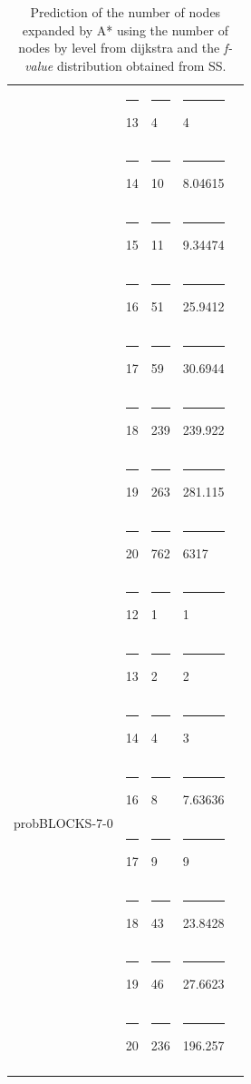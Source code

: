 \documentclass[11pt,a4paper,oneside]{report}
\begin{document}
\begin{longtable}{@{\extracolsep{\fill}} lllll @{}}
                                &\rule{4pt}{0ex} 13        &\rule{4pt}{0ex} 4               &\rule{4pt}{0ex} 4          \\ \cline{2-4} 
                                &\rule{4pt}{0ex} 14        &\rule{4pt}{0ex} 10              &\rule{4pt}{0ex} 8.04615      \\ \cline{2-4} 
                                &\rule{4pt}{0ex} 15        &\rule{4pt}{0ex} 11              &\rule{4pt}{0ex} 9.34474      \\ \cline{2-4} 
                                &\rule{4pt}{0ex} 16        &\rule{4pt}{0ex} 51              &\rule{4pt}{0ex} 25.9412      \\ \cline{2-4} 
                                &\rule{4pt}{0ex} 17        &\rule{4pt}{0ex} 59              &\rule{4pt}{0ex} 30.6944      \\ \cline{2-4} 
                                &\rule{4pt}{0ex} 18        &\rule{4pt}{0ex} 239             &\rule{4pt}{0ex} 239.922      \\ \cline{2-4} 
                                &\rule{4pt}{0ex} 19        &\rule{4pt}{0ex} 263             &\rule{4pt}{0ex} 281.115      \\ \cline{2-4} 
                                &\rule{4pt}{0ex} 20        &\rule{4pt}{0ex} 762             &\rule{4pt}{0ex} 6317         \\ \hline                                
\multirow{8}{*}{probBLOCKS-7-0} &\rule{4pt}{0ex} 12        &\rule{4pt}{0ex} 1                &\rule{4pt}{0ex} 1           \\ \cline{2-4}
                                &\rule{4pt}{0ex} 13        &\rule{4pt}{0ex} 2                &\rule{4pt}{0ex} 2           \\ \cline{2-4}
                                &\rule{4pt}{0ex} 14        &\rule{4pt}{0ex} 4                &\rule{4pt}{0ex} 3     \\ \cline{2-4}
                                &\rule{4pt}{0ex} 16        &\rule{4pt}{0ex} 8                &\rule{4pt}{0ex} 7.63636     \\ \cline{2-4}
                                &\rule{4pt}{0ex} 17        &\rule{4pt}{0ex} 9                &\rule{4pt}{0ex} 9           \\ \cline{2-4} 
                                &\rule{4pt}{0ex} 18        &\rule{4pt}{0ex} 43               &\rule{4pt}{0ex} 23.8428     \\ \cline{2-4} 
                                &\rule{4pt}{0ex} 19        &\rule{4pt}{0ex} 46               &\rule{4pt}{0ex} 27.6623     \\ \cline{2-4} 
                                &\rule{4pt}{0ex} 20        &\rule{4pt}{0ex} 236              &\rule{4pt}{0ex} 196.257     \\ \hline                              
\caption{Prediction of the number of nodes expanded by A* using the number of nodes by level from dijkstra and the \textit{f-value} distribution obtained from SS.}
\label{table:predictionDFS}
\end{longtable}
\end{document}
